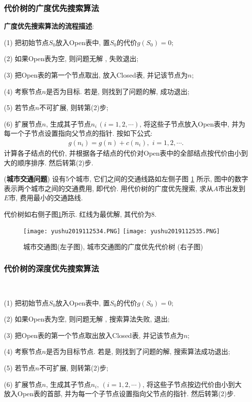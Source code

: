 \subsubsection{代价树的广度优先搜索算法}

\textbf{广度优先搜索算法的流程描述}:

\quad (1) 把初始节点$S_0$放入Open表中, 置$S_0$的代价$g(S_0)=0$;

\quad (2) 如果Open表为空, 则问题无解 , 失败退出;

\quad (3) 把Open表的第一个节点取出, 放入Closed表, 并记该节点为$n$;

\quad (4) 考察节点$n$是否为目标. 若是, 则找到了问题的解, 成功退出;

\quad (5) 若节点$n$不可扩展, 则转第(2)步;

\quad (6) 扩展节点$n$, 生成其子节点$n_i\,(i=1, 2, \cdots)$, 将这些子节点放入Open表中, 并为每一个子节点设置指向父节点的指针. 按如下公式:
\begin{align}
    g(n_i)=g(n)+c(n_i),\,\,i=1,2,\cdots.
\end{align}
计算各子结点的代价, 并根据各子结点的代价对Open表中的全部结点按代价由小到大的顺序排序. 然后转第(2)步.
\begin{example}
    (\textbf{城市交通问题}) 设有5个城市, 它们之间的交通线路如左侧子图 \ref{AI32fig2019120234} 所示, 图中的数字表示两个城市之间的交通费用, 即代价. 
    用代价树的广度优先搜索, 求从$A$市出发到$E$市, 费用最小的交通路线.
\end{example}
\begin{result}
代价树如右侧子图\ref{AI32fig2019120234}所示. 红线为最优解, 其代价为8.
\begin{figure}[H]
    \centering
    \texttt{[image: yushu2019112534.PNG]}
    \texttt{[image: yushu2019112535.PNG]}
    \caption{城市交通图(左子图), 城市交通图的广度优先代价树 (右子图)}
    \label{AI32fig2019120234}
\end{figure}
\subsubsection{代价树的深度优先搜索算法}~{}

\quad (1) 把初始节点$S_0$放入Open表中, 置$S_0$的代价$g(S_0)=0$;

\quad (2) 如果Open表为空, 则问题无解 , 搜索算法失败, 退出;

\quad (3) 把Open表的第一个节点取出放入Closed表, 并记该节点为$n$;

\quad (4) 考察节点$n$是否为目标节点. 若是, 则找到了问题的解, 搜索算法成功退出;

\quad (5) 若节点$n$不可扩展, 则转第(2)步;

\quad (6) 扩展节点$n$, 生成其子节点$n_i,\,(i=1, 2,\cdots)$, 将这些子节点按边代价由小到大放入Open表的首部, 并为每一个子节点设置指向父节点的指针. 然后转第(2)步.
\end{result}
